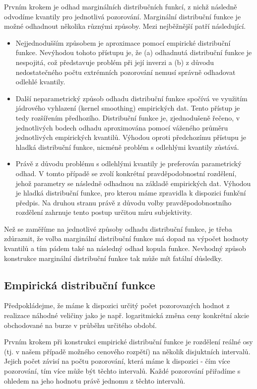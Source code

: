 Prvním krokem je odhad marginálních distribučních funkcí, z nichž následně odvodíme kvantily pro jednotlivá pozorování. Marginální distribuční funkce je možné odhadnout několika různými způsoby. Mezi nejběžnější patří následující.
\begin{itemize}
\item Nejjednodušším způsobem je aproximace pomocí empirické distribuční funkce. Nevýhodou tohoto přístupu je, že (a) odhadnutá distribuční funkce je nespojitá, což představuje problém při její inverzi a (b) z důvodu nedostatečného počtu extrémních pozorování nemusí správně odhadovat odlehlé kvantily.
\item Další neparametrický způsob odhadu distribuční funkce spočívá ve využitím jádrového vyhlazení (kernel smoothing) empirických dat. Tento přístup je tedy rozšířením předhozího. Distribuční funkce je, zjednodušeně řečeno, v jednotlivých bodech odhadu aproximována pomocí váženého průměru jednotlivých empirických kvantilů. Výhodou oproti předchozímu přístupu je hladká distribuční funkce, nicméně problém s odlehlými kvantily zůstává.
\item Právě z důvodu problému s odlehlými kvantily je preferován parametrický odhad. V tomto případě se zvolí konkrétní pravděpodobnostní rozdělení, jehož parametry se následně odhadnou na základě empirických dat. Výhodou je hladká distribuční funkce, pro kterou máme zpravidla k dispozici funkční předpis. Na druhou stranu právě z důvodu volby pravděpodobnostního rozdělení zahrnuje tento postup určitou míru subjektivity.
\end{itemize}

Než se zaměříme na jednotlivé způsoby odhadu distribuční funkce, je třeba zdůraznit, že volba marginální distribuční funkce má dopad na výpočet hodnoty kvantilů a tím pádem také na následný odhad kopula funkce. Nevhodný způsob konstrukce marginální distribuční funkce tak může mít fatální důsledky.

\subsection{Empirická distribuční funkce}

Předpokládejme, že máme k dispozici určitý počet pozorovaných hodnot z realizace náhodné veličiny jako je např. logaritmická změna ceny konkrétní akcie obchodované na burze v průběhu určitého období.

Prvním krokem při konstrukci empirické distribuční funkce je rozdělení reálné osy (tj. v našem případě možného cenového rozpětí) na několik disjuktních intervalů. Jejich počet závisí na počtu pozorování, která máme k dispozici - čím více pozorování, tím více může být těchto intervalů. Každé pozorování přiřadíme  s ohledem na jeho hodnotu právě jednomu z těchto intervalů.

